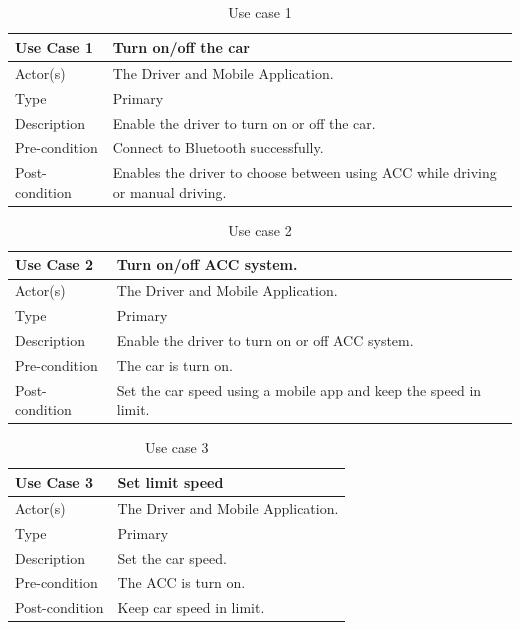 \documentclass[12pt,a4paper]{report}
\begin{document}
\subsection{\fontsize{12}{12}\selectfont{ACC use case tables:}}
\begin{table}[H]
\begin{center}
\caption{Use case 1}
\label{tab:use3} 
\begin{tabular}{|p{3cm}|p{11cm}|}
\hline
\textbf{Use Case 1} & \textbf{Turn on/off the car}\\ 
\hline
Actor(s)&The Driver and Mobile Application.\\\hline
Type&Primary\\\hline
Description&Enable the driver to turn on or off the car.\\\hline
Pre-condition&Connect to Bluetooth successfully.\\\hline
Post-condition&Enables the driver to choose between using ACC while driving or manual driving.\\\hline
\end{tabular}
\end{center}  
\end{table}
\begin{table}[H]
\begin{center}
\caption{Use case 2}
\label{tab:use4}
\begin{tabular}{|p{3cm}|p{11cm}|}
\hline
\textbf{Use Case 2} & \textbf{Turn on/off ACC system.}\\ 
\hline
Actor(s)&The Driver and Mobile Application.\\\hline
Type&Primary\\\hline
Description&Enable the driver to turn on or off ACC system.\\\hline
Pre-condition&The car is turn on.\\\hline
Post-condition&Set the car speed using a mobile app and keep the speed in limit.\\\hline
\end{tabular}
\end{center}  
\end{table}
\begin{table}[H]
\begin{center}
\caption{Use case 3}
\label{tab:use5}
\begin{tabular}{|p{3cm}|p{11cm}|}
\hline
\textbf{Use Case 3} & \textbf{Set limit speed
}\\ 
\hline
Actor(s)&The Driver and Mobile Application.\\\hline
Type&Primary\\\hline
Description&Set the car speed.\\\hline
Pre-condition&The ACC is turn on.\\\hline
Post-condition&Keep car speed in limit.\\\hline
\end{tabular}
\end{center}  
\end{table}
\end{document}
